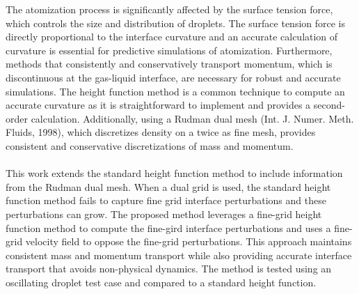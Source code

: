 
The atomization process is significantly affected by the surface tension force, which controls the size and distribution of droplets. The surface tension force is directly proportional to the interface curvature and an accurate calculation of curvature is essential for predictive simulations of atomization. Furthermore, methods that consistently and conservatively transport momentum, which is discontinuous at the gas-liquid interface, are necessary for robust and accurate simulations. The height function method is a common technique to compute an accurate curvature as it is straightforward to implement and provides a second-order calculation. Additionally, using a Rudman dual mesh (Int. J. Numer. Meth. Fluids, 1998),  which discretizes density on a twice as fine mesh, provides consistent and conservative discretizations of mass and momentum. \\
\\
\indent This work extends the standard height function method to include information from the Rudman dual mesh.  When a dual grid is used, the standard height function method fails to capture fine grid interface perturbations and these perturbations can grow.  The proposed method leverages a fine-grid height function method to compute the fine-gird interface perturbations and uses a fine-grid velocity field to oppose the fine-grid perturbations. This approach maintains consistent mass and momentum transport while also providing accurate interface transport that avoids non-physical dynamics. The method is tested using an oscillating droplet test case and compared to a standard height function. 